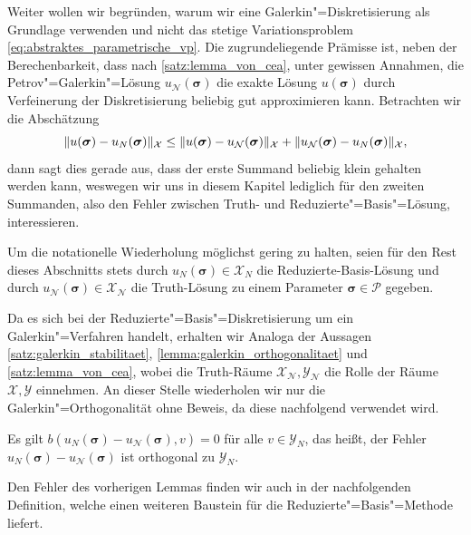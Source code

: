 \documentclass[../main.tex]{subfiles}
\begin{document}
Weiter wollen wir begründen, warum wir eine Galerkin"=Diskretisierung als Grundlage verwenden und nicht das stetige Variationsproblem \cref{eq:abstraktes_parametrische_vp}.
Die zugrundeliegende Prämisse ist, neben der Berechenbarkeit, dass nach \cref{satz:lemma_von_cea}, unter gewissen Annahmen, die Petrov"=Galerkin"=Lösung $u_{\mathcal N}(\bm \sigma)$ die exakte Lösung $u(\bm \sigma)$ durch Verfeinerung der Diskretisierung beliebig gut approximieren kann.
Betrachten wir die Abschätzung
\begin{equation}
    \lVert u(\bm \sigma) - u_{N}(\bm \sigma)\rVert_{\mathcal X} \leq \lVert u(\bm \sigma) - u_{\mathcal N}(\bm \sigma)\rVert_{\mathcal X} + \lVert u_{\mathcal N}(\bm \sigma) - u_{N}(\bm \sigma)\rVert_{\mathcal X},
\end{equation}
dann sagt dies gerade aus, dass der erste Summand beliebig klein gehalten werden kann, weswegen wir uns in diesem Kapitel lediglich für den zweiten Summanden, also den Fehler zwischen Truth- und Reduzierte"=Basis"=Lösung, interessieren.

Um die notationelle Wiederholung möglichst gering zu halten, seien für den Rest dieses Abschnitts stets durch $u_{N}(\bm \sigma) \in \mathcal X_{N}$ die Reduzierte-Basis-Lösung und durch $u_{\mathcal N}(\bm \sigma) \in \mathcal X_{\mathcal N}$ die Truth-Lösung zu einem Parameter $\bm \sigma \in \mathcal P$ gegeben.

Da es sich bei der Reduzierte"=Basis"=Diskretisierung um ein Galerkin"=Verfahren handelt, erhalten wir Analoga der Aussagen \cref{satz:galerkin_stabilitaet}, \cref{lemma:galerkin_orthogonalitaet} und \cref{satz:lemma_von_cea}, wobei die Truth-Räume $\mathcal X_{\mathcal N}, \mathcal Y_{\mathcal N}$ die Rolle der Räume $\mathcal X, \mathcal Y$ einnehmen.
An dieser Stelle wiederholen wir nur die Galerkin"=Orthogonalität ohne Beweis, da diese nachfolgend verwendet wird.

\begin{Lemma}
    \label{lemma:rb_galerkin_orthogonalitaet}
    Es gilt $b(u_{N}(\bm \sigma) - u_{\mathcal N}(\bm \sigma), v) = 0$ für alle $v \in \mathcal Y_{N}$, das heißt, der Fehler $u_{N}(\bm \sigma) - u_{\mathcal N}(\bm \sigma)$ ist orthogonal zu $\mathcal Y_{N}$.
\end{Lemma}

Den Fehler des vorherigen Lemmas finden wir auch in der nachfolgenden Definition, welche einen weiteren Baustein für die Reduzierte"=Basis"=Methode liefert.
\end{document}
